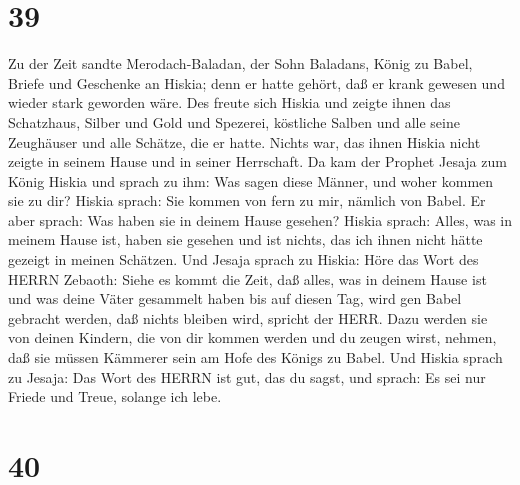 \hypertarget{section-38}{%
\section{39}\label{section-38}}

 Zu der Zeit sandte Merodach-Baladan, der Sohn Baladans,
König zu Babel, Briefe und Geschenke an Hiskia; denn er hatte gehört,
daß er krank gewesen und wieder stark geworden wäre.  Des
freute sich Hiskia und zeigte ihnen das Schatzhaus, Silber und Gold und
Spezerei, köstliche Salben und alle seine Zeughäuser und alle Schätze,
die er hatte. Nichts war, das ihnen Hiskia nicht zeigte in seinem Hause
und in seiner Herrschaft.  Da kam der Prophet Jesaja zum
König Hiskia und sprach zu ihm: Was sagen diese Männer, und woher kommen
sie zu dir? Hiskia sprach: Sie kommen von fern zu mir, nämlich von
Babel.  Er aber sprach: Was haben sie in deinem Hause
gesehen? Hiskia sprach: Alles, was in meinem Hause ist, haben sie
gesehen und ist nichts, das ich ihnen nicht hätte gezeigt in meinen
Schätzen.  Und Jesaja sprach zu Hiskia: Höre das Wort des
HERRN Zebaoth:  Siehe es kommt die Zeit, daß alles, was in
deinem Hause ist und was deine Väter gesammelt haben bis auf diesen Tag,
wird gen Babel gebracht werden, daß nichts bleiben wird, spricht der
HERR.  Dazu werden sie von deinen Kindern, die von dir
kommen werden und du zeugen wirst, nehmen, daß sie müssen Kämmerer sein
am Hofe des Königs zu Babel.  Und Hiskia sprach zu Jesaja:
Das Wort des HERRN ist gut, das du sagst, und sprach: Es sei nur Friede
und Treue, solange ich lebe.

\hypertarget{section-39}{%
\section{40}\label{section-39}}

